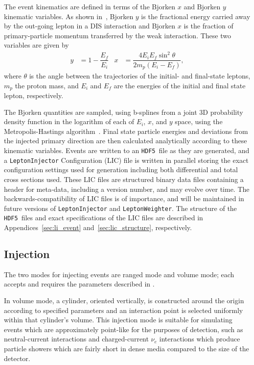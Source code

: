 \documentclass[main.tex]{subfiles}
\newcommand{\LeptonInjector}{\texttt{LeptonInjector}}
\newcommand{\LeptonWeighter}{\texttt{LeptonWeighter}}
\newcommand{\hdf}{\texttt{HDF5}}
\begin{document}
The event kinematics are defined in terms of the Bjorken $x$ and Bjorken $y$ kinematic variables.
As shown in~, Bjorken $y$ is the fractional energy carried away by the out-going lepton in a DIS interaction and Bjorken $x$ is the fraction of primary-particle momentum transferred by the weak interaction.
These two variables are given by
\begin{align}\label{eq:bjorken}
y&=1-\dfrac{E_{f}}{E_{i}} & x&=\dfrac{4 E_{i} E_{f}\sin^{2}\theta}{2m_{p}(E_{i}-E_{f})},
\end{align}
where $\theta$ is the angle between the trajectories of the initial- and final-state leptons, $m_{p}$ the proton mass, and $E_{i}$ and $E_{f}$ are the energies of the initial and final state lepton, respectively.

The Bjorken quantities are sampled, using b-splines from a joint 3D probability density function in the logarithm of each of $E_{i}$, $x$, and $y$ space, using the Metropolis-Hastings algorithm~\cite{MetHast:10.1093}.
Final state particle energies and deviations from the injected primary direction are then calculated analytically according to these kinematic variables.
Events are written to an \hdf~file as they are generated, and a \LeptonInjector{} Configuration (LIC) file is written in parallel storing the exact configuration settings used for generation including both differential and total cross sections used.
These LIC files are structured binary data files containing a header for meta-data, including a version number, and may evolve over time.
The backwards-compatibility of LIC files is of importance, and will be maintained in future versions of \LeptonInjector{} and \LeptonWeighter{}.
The structure of the \hdf~files and exact specifications of the LIC files are described in Appendices~\ref{sec:li_event} and~\ref{sec:lic_structure}, respectively. 

\subsection{Injection}\label{sec:injection}

The two modes for injecting events are ranged mode and volume mode; each accepts and requires the parameters described in .

In volume mode, a cylinder, oriented vertically, is constructed around the origin according to specified parameters and an interaction point is selected uniformly within that cylinder's volume.
This injection mode is suitable for simulating events which are approximately point-like for the purposes of detection, such as neutral-current interactions and charged-current $\nu_e$ interactions which produce particle showers which are fairly short in dense media compared to the size of the detector.
\end{document}
